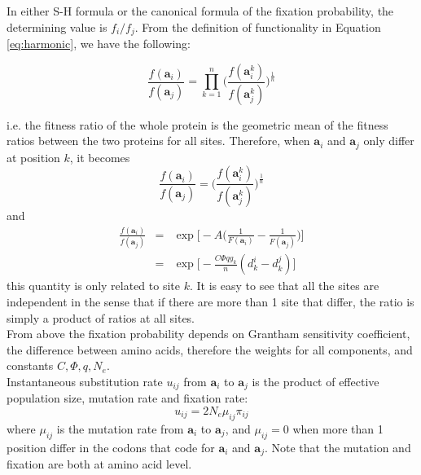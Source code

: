 \documentclass[13pt]{article}
\begin{document}
In either S-H formula or the canonical formula of the fixation probability, the determining value is $f_i/f_j$.
From the definition of functionality in Equation \ref{eq:harmonic}, we have the following:

\begin{equation}
\frac{f(\mathbf{a}_i)}{f(\mathbf{a}_j)} = \prod_{k=1}^n\Big( \frac{f(\mathbf{a}_i^k)}{f(\mathbf{a}_j^k)}\Big)^{\frac{1}{n}}
\end{equation}


i.e. the fitness ratio of the whole protein is the geometric mean of the fitness ratios between the two proteins for all sites. Therefore, when $\mathbf{a}_i$ and $\mathbf{a}_j$ only differ at position $k$, it becomes  
\[\frac{f(\mathbf{a}_i)}{f(\mathbf{a}_j)} = \Big( \frac{f(\mathbf{a}_i^k)}{f(\mathbf{a}_j^k)}\Big)^{\frac{1}{n}}\]
and
\begin{eqnarray}
\frac{f(\mathbf{a}_i)}{f(\mathbf{a}_j)} & = &\exp \Big[-A\Big( \frac{1}{F(\mathbf{a}_i )} - \frac{1}{F(\mathbf{a}_j )}\Big)\Big] \nonumber\\
& = & \exp\Big[ -\frac{C\Phi q g_k}{n}(d_k^i - d_k^j)\Big] \label{eq: ratio}
\end{eqnarray}
\noindent
this quantity is only related to site $k$. It is easy to see that all the sites are independent in the sense that if there are more than 1 site that differ, the ratio is simply a product of ratios at all sites. \\

From above the fixation probability depends on Grantham sensitivity coefficient, the difference between amino acids, therefore the weights for all components, and constants $C, \Phi, q, N_e$.\\

Instantaneous substitution rate $u_{ij}$ from $\mathbf{a}_i$ to $\mathbf{a}_j$ is the product of effective population size, mutation rate and fixation rate:
\begin{equation}
u_{ij} = 2N_e \mu_{ij} \pi_{ij}
\label{eq:subrate}
\end{equation}
where $\mu_{ij}$ is the mutation rate from $\mathbf{a}_i$ to $\mathbf{a}_j$, and $\mu_{ij} = 0$ when more than 1 position differ in the codons that code for $\mathbf{a}_i$ and $\mathbf{a}_j$. Note that the mutation and fixation are both at amino acid level. \\
\end{document}
